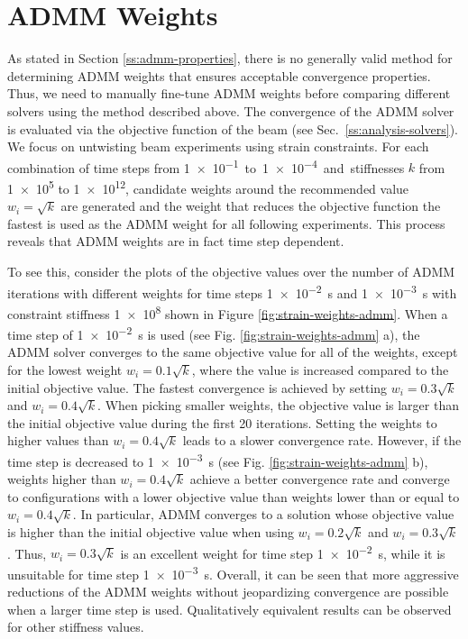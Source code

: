 \section{ADMM Weights}\label{ss:admm-weights}
As stated in Section \ref{ss:admm-properties}, there is no generally valid method for determining ADMM weights that ensures acceptable convergence properties.
Thus, we need to manually fine-tune ADMM weights before comparing different solvers using the method described above. The convergence of the ADMM solver is evaluated via 
the objective function of the beam (see Sec.\ \ref{ss:analysis-solvers}). We focus on untwisting beam experiments using strain constraints. For 
each combination of time steps from \SI{1e-1} to \SI{1e-4} and stiffnesses $k$ from \num{1e5} to \num{1e12}, candidate weights around the recommended value $w_i = \sqrt{k}$ 
are generated and the weight that reduces the objective function the fastest is used as the ADMM weight for all following experiments. 
This process reveals that ADMM weights are in fact time step dependent.

To see this, consider the plots of the objective values over the number of ADMM iterations with different weights for time steps \SI{1e-2}{\second} and 
\SI{1e-3}{\second} with constraint stiffness \num{1e8} shown in Figure \ref{fig:strain-weights-admm}. When a time step 
of \SI{1e-2}{\second} is used (see Fig. \ref{fig:strain-weights-admm} a), the ADMM solver converges to the same objective value for all of the weights, except for the 
lowest weight $w_i = 0.1\sqrt{k}$, where the value is increased compared to the initial objective value. The fastest convergence is achieved by setting $w_i = 0.3\sqrt{k}$ and 
$w_i = 0.4\sqrt{k}$. When picking smaller weights, the objective value is larger than the initial objective value during the first 20 iterations. Setting the weights to 
higher values than $w_i = 0.4\sqrt{k}$ leads to a slower convergence rate. However, if the time step is decreased to \SI{1e-3}{\second} (see Fig. \ref{fig:strain-weights-admm} b), 
weights higher than $w_i = 0.4\sqrt{k}$ achieve a better convergence rate and converge to configurations with a lower objective value than weights lower than 
or equal to $w_i = 0.4\sqrt{k}$. In particular, ADMM converges to a solution whose objective value is higher than the initial objective value when using $w_i = 0.2\sqrt{k}$ and 
$w_i = 0.3\sqrt{k}$. Thus, $w_i = 0.3\sqrt{k}$ is an excellent weight for time step \SI{1e-2}{\second}, while it is unsuitable for time step \SI{1e-3}{\second}. Overall, it 
can be seen that more aggressive reductions of the ADMM weights without jeopardizing convergence are possible when a larger time step is used. Qualitatively equivalent results 
can be observed for other stiffness values. 

